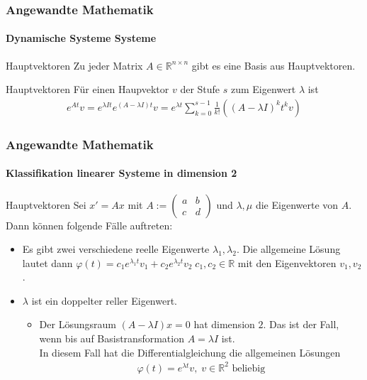\documentclass{beamer}
\begin{document}
\begin{frame}
    \frametitle{Angewandte Mathematik}
\framesubtitle{Dynamische Systeme Systeme}
\begin{block}{Hauptvektoren}
Zu jeder Matrix $A \in \mathbb{R}^{n \times n}$ gibt es eine Basis aus Hauptvektoren. 
\end{block}

\begin{block}{Hauptvektoren}
    Für einen Haupvektor $v$ der Stufe $s$ zum Eigenwert $\lambda$ ist
    \begin{align*}
       e^{A t} v = e^{\lambda I t}e^{(A - \lambda I)t} v = e^{\lambda t} \sum_{k=0}^{s-1} \frac{1}{k!}((A - \lambda I)^k t^k v)
    \end{align*}
\end{block}

\end{frame}


\begin{frame}
    \frametitle{Angewandte Mathematik}
\framesubtitle{Klassifikation linearer Systeme in dimension 2}
\begin{block}{Hauptvektoren}
Sei $x' = Ax$ mit $A:=\begin{pmatrix} a & b \\ c & d \end{pmatrix}$ und $\lambda, \mu$ die Eigenwerte von $A$.
Dann können folgende Fälle auftreten:
\begin{itemize}
  \item   Es gibt zwei verschiedene reelle Eigenwerte $\lambda_1, \lambda_2$. Die allgemeine Lösung lautet dann
	    $\varphi(t) = c_1 e^{\lambda_1 t} v_1 +c_2 e^{\lambda_2 t} v_2 \; c_1, c_2 \in \mathbb{R}$	mit den Eigenvektoren $v_1, v_2$.
    \item $\lambda$ ist ein doppelter reller Eigenwert.
        \begin{itemize}
            \item Der Lösungsraum $(A - \lambda I)x = 0$ hat dimension $2$. Das ist der Fall,
                wenn bis auf Basistransformation $A = \lambda I$ ist. \\
                In diesem Fall hat die Differentialgleichung die allgemeinen Lösungen 
                \begin{align*}
                    \varphi(t) = e^{\lambda t}v, \; v \in \mathbb{R}^2 \text{ beliebig}
                \end{align*}
            \end{itemize}

\end{itemize}

\end{block}

\end{frame}
\end{document}
